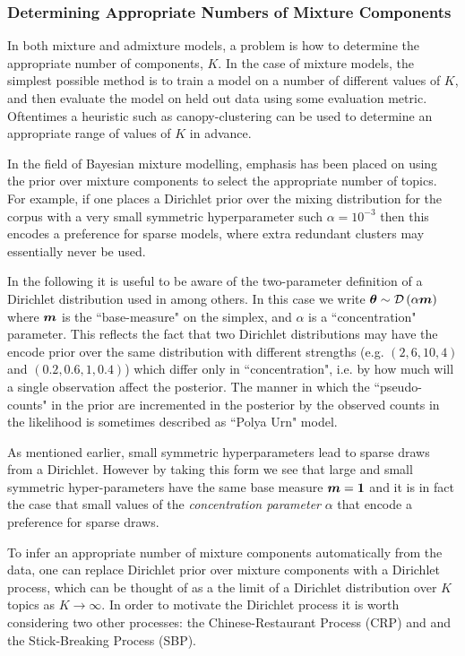 

\subsubsection{Determining Appropriate Numbers of Mixture Components}
\label{sec:DPs}
In both mixture and admixture models, a problem is how to determine the appropriate number of components, $K$. In the case of mixture models, the simplest possible method is to train a model on a number of different values of $K$, and then evaluate the model on held out data using some evaluation metric. Oftentimes a heuristic such as canopy-clustering\cite{McCallum2000} can be used to determine an appropriate range of values of $K$ in advance.

In the field of Bayesian mixture modelling, emphasis has been placed on using the prior over mixture components to select the appropriate number of topics. For example, if one places a Dirichlet prior over the mixing distribution for the corpus with a very small symmetric hyperparameter such $\alpha = 10^{-3}$ then this encodes a preference for sparse models, where extra redundant clusters may essentially never be used. 

In the following it is useful to be aware of the two-parameter definition of a Dirichlet distribution used in \cite{MacKay1995}\cite{Wallach2006}\cite{Wallach2009a} among others. In this case we write $\bm \theta \sim \mathcal{D} \left( {\alpha \bm m} \right)$ where $\bm m$ is the ``base-measure" on the simplex, and $\alpha$ is a ``concentration" parameter. This reflects the fact that two Dirichlet distributions may have the encode prior over the same distribution with different strengths (e.g. $(2, 6, 10, 4)$ and $(0.2, 0.6, 1, 0.4)$) which differ only in ``concentration", i.e. by how much will a single observation affect the posterior. The manner in which the ``pseudo-counts" in the prior are incremented in the posterior by the observed counts in the likelihood is sometimes described as ``Polya Urn" model.

As mentioned earlier, small symmetric hyperparameters lead to sparse draws from a Dirichlet. However by taking this form we see that large and small symmetric hyper-parameters have the same base measure $\bm m=\bm 1$ and it is in fact the case that small values of the \emph{concentration parameter} $\alpha$ that encode a preference for sparse draws.

To infer an appropriate number of mixture components automatically from the data, one can replace Dirichlet prior over mixture components with a Dirichlet process, which can be thought of as a the limit of a Dirichlet distribution over $K$ topics as $K \rightarrow \infty$. In order to motivate the Dirichlet process it is worth considering two other processes: the Chinese-Restaurant Process (CRP) and and the Stick-Breaking Process (SBP).

